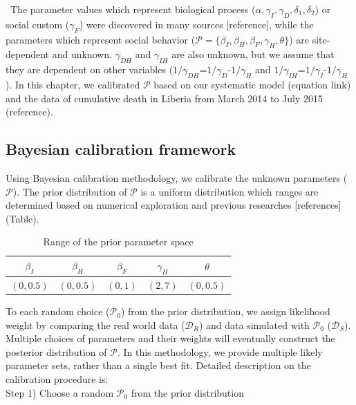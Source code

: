 \newpage
\label{sec:calibration}
\
The parameter values which represent biological process ($\alpha, \gamma_{I}, \gamma_{D}, \delta_{1}, \delta_{2}$) or social custom ($\gamma_{F}$) were discovered in many sources [reference], while the parameters which represent social behavior ($\mathcal{P}=\{\beta_{I}, \beta_{H}, \beta_{F}, \gamma_{H}, \theta\}$) are site-dependent and unknown. $\gamma_{DH}$ and $\gamma_{IH}$ are also unknown, but we assume that they are dependent on other variables ($1/\gamma_{DH}$=$1/\gamma_{D}$-$1/\gamma_{H}$ and $1/\gamma_{IH}$=$1/\gamma_{I}$-$1/\gamma_{H}$). In this chapter, we calibrated $\mathcal{P}$ based on our systematic model (equation link) and the data of cumulative death in Liberia from March 2014 to July 2015 (reference).
\subsection{Bayesian calibration framework}
Using Bayesian calibration methodology, we calibrate the unknown parameters ($\mathcal{P}$). The prior distribution of $\mathcal{P}$ is a uniform distribution which ranges are determined based on numerical exploration and previous researches [references] (Table). \\

\begin{table}[ht]
\caption{Range of the prior parameter space} %
\centering %
\begin{tabular}{c c c c c}
\hline\hline %
$\beta_{I}$ & $\beta_{H}$ & $\beta_{F}$ & $\gamma_{H}$ & $\theta$ \\ [0.5ex]
\hline %
$(0,0.5)$ & $(0,0.5)$ & $(0,1)$ & $(2,7)$ & $(0,0.5)$ \\ [0.5ex]
\hline
\end{tabular}
\label{tab:Prior Ranges}
\end{table}


To each random choice ($\mathcal{P}_0$) from the prior distribution, we assign likelihood weight by comparing the real world data ($\mathcal{D}_R$) and data simulated with $\mathcal{P}_0$ ($\mathcal{D}_S$). Multiple choices of parameters and their weights will eventually construct the posterior distribution of $\mathcal{P}$. In this methodology, we provide multiple likely parameter sets, rather than a single best fit. Detailed description on the calibration procedure is:\\

Step 1) Choose a random $\mathcal{P}_0$ from the prior distribution

